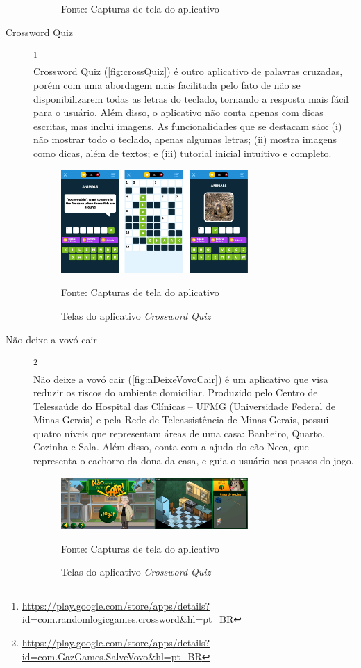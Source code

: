 \begin{description}
\begin{figure}[H]
    Fonte: Capturas de tela do aplicativo
\end{figure}

\item[Crossword Quiz]\footnote{\url{https://play.google.com/store/apps/details?id=com.randomlogicgames.crossword&hl=pt_BR}} \hfill \\
Crossword Quiz (\autoref{fig:crossQuiz}) é outro aplicativo de palavras cruzadas, porém com uma abordagem mais facilitada pelo fato de não se disponibilizarem todas as letras do teclado, tornando a resposta mais fácil para o usuário. Além disso, o aplicativo não conta apenas com dicas escritas, mas inclui imagens. As funcionalidades que se destacam são: (i) não mostrar todo o teclado, apenas algumas letras; (ii) mostra imagens como dicas, além de textos; e (iii) tutorial inicial intuitivo e completo.

\begin{figure}[H]
\centering
    \caption{Telas do aplicativo \textit{Crossword Quiz}}
    \label{fig:crossQuiz}
    \includegraphics[width=0.7\textwidth]{Figuras/crosswordQuiz.jpg}
    
    Fonte: Capturas de tela do aplicativo
\end{figure}


\item[Não deixe a vovó cair]\footnote{\url{https://play.google.com/store/apps/details?id=com.GazGames.SalveVovo&hl=pt_BR}} \hfill \\
Não deixe a vovó cair (\autoref{fig:nDeixeVovoCair}) é um aplicativo que visa reduzir os riscos do ambiente domiciliar. Produzido pelo Centro de Telessaúde do Hospital das Clínicas – UFMG (Universidade Federal de Minas Gerais) e pela Rede de Teleassistência de Minas Gerais, possui quatro níveis que representam áreas de uma casa: Banheiro, Quarto, Cozinha e Sala. Além disso, conta com a ajuda do cão Neca, que representa o cachorro da dona da casa, e guia o usuário nos passos do jogo.
\begin{figure}[H]
\centering
    \caption{Telas do aplicativo \textit{Crossword Quiz}}
    \label{fig:nDeixeVovoCair}
    \includegraphics[width=0.7\textwidth]{Figuras/nDeixeVovoCair.jpg}
    
    Fonte: Capturas de tela do aplicativo
\end{figure}

\end{description}

